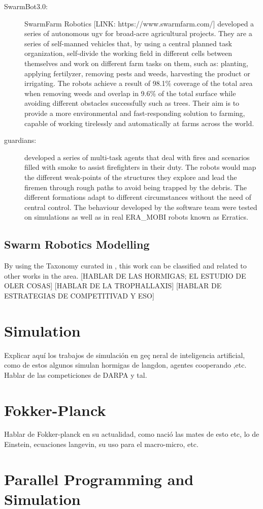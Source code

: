 \begin{description}
\item[SwarmBot3.0: ] SwarmFarm Robotics [LINK: https://www.swarmfarm.com/] \citep{F_SwarmFarm} developed a series of autonomous \gls{ugv} for broad-acre agricultural projects. They are a series of self-manned vehicles that, by using a central planned task organization, self-divide the working field in different cells between themselves and work on different farm tasks on them, such as: planting, applying fertilyzer, removing pests and weeds, harvesting the product or irrigating. The robots achieve a result of 98.1\% coverage of the total area when removing weeds and overlap in 9.6\% of the total surface while avoiding different obstacles successfully such as trees. Their aim is to provide a more environmental and fast-responding solution to farming, capable of working tirelessly and automatically at farms across the world.

\item[\gls{guardians}: ] \citet{G_Guardians} developed a series of multi-task agents that deal with fires and scenarios filled with smoke to assist firefighters in their duty. The robots would map the different weak-points of the structures they explore and lead the firemen through rough paths to avoid being trapped by the debris. The different formations adapt to different circumstances without the need of central control. The behaviour developed by the software team were tested on simulations as well as in real ERA_MOBI robots known as Erratics. 

\end{description}

\subsection{Swarm Robotics Modelling}
By using the Taxonomy curated in \cite{D_Swarm_Applications}, this work can be classified and related to other works in the area.
[HABLAR DE LAS HORMIGAS; EL ESTUDIO DE OLER COSAS]
[HABLAR DE LA TROPHALLAXIS]
[HABLAR DE ESTRATEGIAS DE COMPETITIVAD Y ESO]


\section{Simulation}
Explicar aquí los trabajos de simulación en geç
neral de inteligencia artificial, como de estos algunos simulan hormigas de langdon, agentes cooperando ,etc. Hablar de las competiciones de DARPA y tal.

\section{Fokker-Planck}
Hablar de Fokker-planck en su actualidad, como nació las mates de esto etc, lo de Einstein, ecuaciones langevin, su uso para el macro-micro, etc.

\section{Parallel Programming and Simulation}